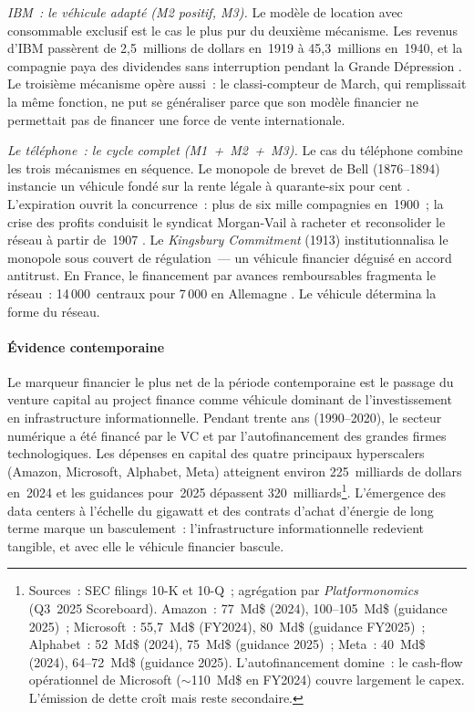 \emph{IBM~: le véhicule adapté (M2 positif, M3).} Le modèle de location avec consommable exclusif est le cas le plus pur du deuxième mécanisme. Les revenus d'IBM passèrent de 2,5~millions de dollars en~1919 à 45,3~millions en~1940, et la compagnie paya des dividendes sans interruption pendant la Grande Dépression \parencite{cortada_before_1993}. Le troisième mécanisme opère aussi~: le classi-compteur de March, qui remplissait la même fonction, ne put se généraliser parce que son modèle financier ne permettait pas de financer une force de vente internationale.

\emph{Le téléphone~: le cycle complet (M1~+~M2~+~M3).} Le cas du téléphone combine les trois mécanismes en séquence. Le monopole de brevet de Bell (1876--1894) instancie un véhicule fondé sur la rente légale à quarante-six pour cent \parencite{gabel_early_1969}. L'expiration ouvrit la concurrence~: plus de six mille compagnies en~1900~; la crise des profits conduisit le syndicat Morgan-Vail à racheter et reconsolider le réseau à partir de~1907 \parencite{mueller_universal_1993}. Le \emph{Kingsbury Commitment} (1913) institutionnalisa le monopole sous couvert de régulation~--- un véhicule financier déguisé en accord antitrust. En France, le financement par \og avances remboursables\fg{} fragmenta le réseau~: 14\,000~centraux pour 7\,000 en Allemagne \parencite{bertho_histoire_1984}. Le véhicule détermina la forme du réseau.


\paragraph{Évidence contemporaine}

Le marqueur financier le plus net de la période contemporaine est le passage du venture capital au project finance comme véhicule dominant de l'investissement en infrastructure informationnelle. Pendant trente ans (1990--2020), le secteur numérique a été financé par le VC et par l'autofinancement des grandes firmes technologiques. Les dépenses en capital des quatre principaux hyperscalers (Amazon, Microsoft, Alphabet, Meta) atteignent environ 225~milliards de dollars en~2024 et les guidances pour~2025 dépassent 320~milliards\footnote{Sources~: SEC filings 10-K et 10-Q~; agrégation par \emph{Platformonomics} (Q3~2025 Scoreboard). Amazon~: 77~Md\$ (2024), 100--105~Md\$ (guidance 2025)~; Microsoft~: 55,7~Md\$ (FY2024), 80~Md\$ (guidance FY2025)~; Alphabet~: 52~Md\$ (2024), 75~Md\$ (guidance 2025)~; Meta~: 40~Md\$ (2024), 64--72~Md\$ (guidance 2025). L'autofinancement domine~: le cash-flow opérationnel de Microsoft (${\sim}$110~Md\$ en FY2024) couvre largement le capex. L'émission de dette croît mais reste secondaire.}. L'émergence des data centers à l'échelle du gigawatt et des contrats d'achat d'énergie de long terme marque un basculement~: l'infrastructure informationnelle redevient tangible, et avec elle le véhicule financier bascule.

